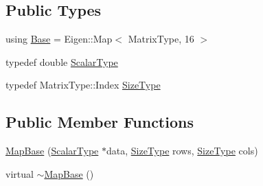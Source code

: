\subsection*{Public Types}
\begin{DoxyCompactItemize}
\item 
using \hyperlink{structffnn_1_1aligned_1_1_map_base_3_01_matrix_type_00_01float_01_4_a06ddb34196d951e0ea339d9f90326386}{Base} = Eigen\-::\-Map$<$ Matrix\-Type, 16 $>$
\item 
typedef double \hyperlink{structffnn_1_1aligned_1_1_map_base_3_01_matrix_type_00_01float_01_4_af122e87e7c75f175c601c93903f27551}{Scalar\-Type}
\item 
typedef Matrix\-Type\-::\-Index \hyperlink{structffnn_1_1aligned_1_1_map_base_3_01_matrix_type_00_01float_01_4_ae7b5a2041350187cb9dedb504c7c9ade}{Size\-Type}
\end{DoxyCompactItemize}
\subsection*{Public Member Functions}
\begin{DoxyCompactItemize}
\item 
\hyperlink{structffnn_1_1aligned_1_1_map_base_3_01_matrix_type_00_01float_01_4_a81922af94456b6f2e48532d6c6e1314d}{Map\-Base} (\hyperlink{structffnn_1_1aligned_1_1_map_base_3_01_matrix_type_00_01float_01_4_af122e87e7c75f175c601c93903f27551}{Scalar\-Type} $\ast$data, \hyperlink{structffnn_1_1aligned_1_1_map_base_3_01_matrix_type_00_01float_01_4_ae7b5a2041350187cb9dedb504c7c9ade}{Size\-Type} rows, \hyperlink{structffnn_1_1aligned_1_1_map_base_3_01_matrix_type_00_01float_01_4_ae7b5a2041350187cb9dedb504c7c9ade}{Size\-Type} cols)
\item 
virtual \hyperlink{structffnn_1_1aligned_1_1_map_base_3_01_matrix_type_00_01float_01_4_a06b546bb05217d547035026844971ba6}{$\sim$\-Map\-Base} ()
\end{DoxyCompactItemize}


